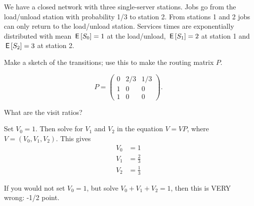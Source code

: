 We have a closed network with three single-server stations. Jobs go from the load/unload station with probability 1/3 to station 2. From stations 1 and 2 jobs can only return to the load/unload station. Services times are exponentially distributed with mean $\,\mathsf{E}\left[S_0\right] = 1$ at the load/unload, $\,\mathsf{E}\left[S_1\right] = 2$ at station 1 and $\,\mathsf{E}\left[S_2\right]=3$ at station 2.

\begin{exercise}[201807]
Make a sketch of the transitions; use this to make the routing matrix $P$.
\begin{solution}
 \begin{equation*}
 P=
 \begin{pmatrix}
 0 & 2/3 & 1/3 \\
1 & 0 & 0 \\
1 & 0 & 0
 \end{pmatrix}.
 \end{equation*}



\end{solution}
\end{exercise}

\begin{exercise}[201807]
 What are the visit ratios?
\begin{solution}
Set $V_0=1$. Then solve for $V_1$ and $V_2$ in the equation $V = VP$, where $V=(V_0, V_1, V_2)$.
This gives
\begin{align*}
V_0&= 1\\
V_1&= \frac{2}{3}\\
V_2&= \frac{1}{3}
\end{align*}

If you would not set $V_0=1$, but solve $V_0+V_1+V_2 = 1$, then this is VERY wrong: -1/2 point.
\end{solution}
\end{exercise}

